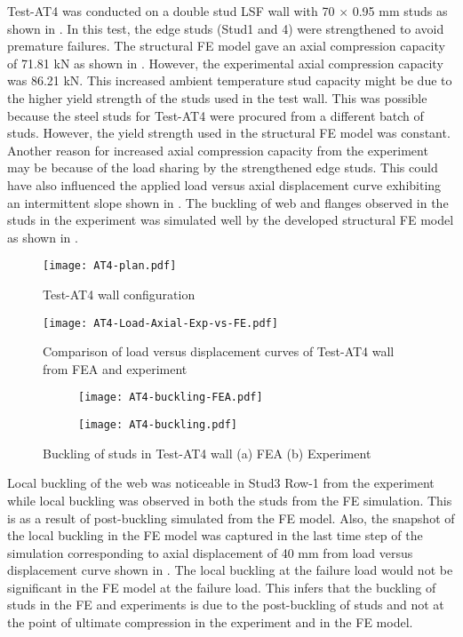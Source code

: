 Test-AT4 was conducted on a double stud LSF wall with 70 $\times$ 0.95 mm studs as shown in . In this test, the edge studs (Stud1 and 4) were strengthened to avoid premature failures. The structural FE model gave an axial compression capacity of 71.81 kN as shown in . However, the experimental axial compression capacity was 86.21 kN. This increased ambient temperature stud capacity might be due to the higher yield strength of the studs used in the test wall. This was possible because the steel studs for Test-AT4 were procured from a different batch of studs. However, the yield strength used in the structural FE model was constant. Another reason for increased axial compression capacity from the experiment may be because of the load sharing by the strengthened edge studs. This could have also influenced the applied load versus axial displacement curve exhibiting an intermittent slope shown in . The buckling of web and flanges observed in the studs in the experiment was simulated well by the developed structural FE model as shown in .
\begin{figure}[!htbp]
	\centering
			\texttt{[image: AT4-plan.pdf]}\\
		\caption{Test-AT4 wall configuration}
		\label{fig:AT4-plan-fea}
\end{figure}
\begin{figure}[!htbp]
	\centering
			\texttt{[image: AT4-Load-Axial-Exp-vs-FE.pdf]}\\
		\caption{Comparison of load versus displacement curves of Test-AT4 wall from FEA and experiment}
		\label{fig:AT4-fea}
\end{figure}
\begin{figure}[!htbp]
	\centering
	\begin{subfigure}[b]{0.35\textwidth}
		\centering
		\texttt{[image: AT4-buckling-FEA.pdf]}
		\caption{}
		\label{subfig:AT4-buckling-FEA}
	\end{subfigure}
	\begin{subfigure}[b]{0.35\textwidth}
		\centering
		\texttt{[image: AT4-buckling.pdf]}
		\caption{}
		\label{subfig:AT4-buckling-experiment}
	\end{subfigure}
	   \caption{Buckling of studs in Test-AT4 wall (a) FEA (b) Experiment}
	   \label{fig:AT4-buckling-fea-comparison}
\end{figure} 

Local buckling of the web was noticeable in Stud3 Row-1 from the experiment while local buckling was observed in both the studs from the FE simulation. This is as a result of post-buckling simulated from the FE model. Also, the snapshot of the local buckling in the FE model was captured in the last time step of the simulation corresponding to axial displacement of 40 mm from load versus displacement curve shown in . The local buckling at the failure load would not be significant in the FE model at the failure load. This infers that the buckling of studs in the FE and experiments is due to the post-buckling of studs and not at the point of ultimate compression in the experiment and in the FE model.    
 
